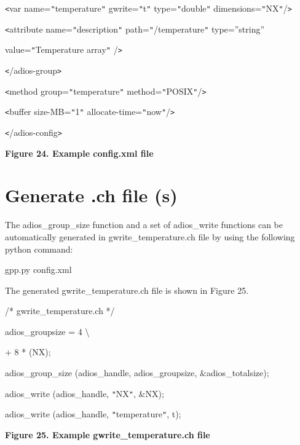\texttt{<}var name=\texttt{"}temperature\texttt{"} gwrite=\texttt{"}t\texttt{"} 
type=\texttt{"}double\texttt{"} dimensions=\texttt{"}NX\texttt{"}/\texttt{>}

\parindent=10pt
\texttt{<}attribute name=\texttt{"}description\texttt{"} path=\texttt{"}/temperature\texttt{"} 
 type=''string''

\parindent=68pt
value=\texttt{"}Temperature array\texttt{"} /\texttt{>}

\parindent=0pt
\texttt{<}/adios-group\texttt{>}

\texttt{<}method group=\texttt{"}temperature\texttt{"} method=\texttt{"}POSIX\texttt{"}/\texttt{>}

\texttt{<}buffer size-MB=\texttt{"}1\texttt{"} allocate-time=\texttt{"}now\texttt{"}/\texttt{>}

\texttt{<}/adios-config\texttt{>}

\label{HRef119579330}\label{HToc144350183}

\leftskip=18pt
{\color{color20} \textbf{Figure 24. Example config.xml file\label{HToc84890293}\label{HToc212016669}\label{HToc212016911}\label{HToc182553442}}}

\section{Generate .ch file (s)}

\leftskip=0pt
The adios\_group\_size function and a set of adios\_write functions can be automatically 
generated in gwrite\_temperature.ch file by using the following python command: 

gpp.py config.xml

The generated gwrite\_temperature.ch file is shown in Figure 25.

/* gwrite\_temperature.ch */

adios\_groupsize = 4 \textbackslash{}

\parindent=57pt
+ 8 * (NX);

\parindent=0pt
adios\_group\_size (adios\_handle, adios\_groupsize, \&adios\_totalsize);

adios\_write (adios\_handle, \texttt{"}NX\texttt{"}, \&NX);

adios\_write (adios\_handle, \texttt{"}temperature\texttt{"}, t);

\label{HRef119579365}\label{HToc144350184}

\leftskip=18pt
{\color{color20} \textbf{Figure 25. Example gwrite\_temperature.ch file\label{HToc84890294}\label{HToc212016670}\label{HToc212016912}\label{HToc182553443}}}

